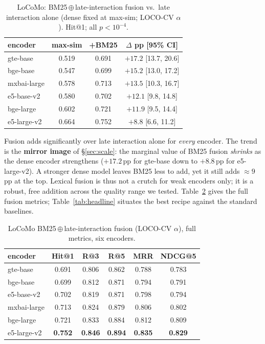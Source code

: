 \documentclass[10pt,twocolumn]{article}
\newcommand{\oxor}{\ensuremath{\oplus}}
\begin{document}
\begin{table}[t]
\centering\small
\caption{LoCoMo: BM25\,\oxor{}\,late-interaction fusion vs.\ late interaction
alone (dense fixed at max-sim; LOCO-CV $\alpha$). Hit@1; all $p<10^{-4}$.}
\label{tab:fuse}
\begin{tabular}{lccc}
\toprule
encoder & max-sim & +BM25 & $\Delta$ pp [95\% CI] \\
\midrule
gte-base    & 0.519 & 0.691 & $+17.2$ [13.7, 20.6] \\
bge-base    & 0.547 & 0.699 & $+15.2$ [13.0, 17.2] \\
mxbai-large & 0.578 & 0.713 & $+13.5$ [10.3, 16.7] \\
e5-base-v2  & 0.580 & 0.702 & $+12.1$ [9.8, 14.8] \\
bge-large   & 0.602 & 0.721 & $+11.9$ [9.5, 14.4] \\
e5-large-v2 & 0.664 & 0.752 & $+8.8$ [6.6, 11.2] \\
\bottomrule
\end{tabular}
\end{table}

Fusion adds significantly over late interaction alone for \emph{every}
encoder. The trend is the \textbf{mirror image} of \S\ref{sec:scale}: the
marginal value of BM25 fusion \emph{shrinks} as the dense encoder strengthens
($+17.2$\,pp for gte-base down to $+8.8$\,pp for e5-large-v2). A stronger dense
model leaves BM25 less to add, yet it still adds $\approx9$\,pp at the top.
Lexical fusion is thus not a crutch for weak encoders only; it is a robust,
free addition across the quality range we tested. Table~\ref{tab:fusionfull}
gives the full fusion metrics; Table~\ref{tab:headline} situates the best
recipe against the standard baselines.

\begin{table}[t]
\centering\small
\caption{LoCoMo BM25\,\oxor{}\,late-interaction fusion (LOCO-CV $\alpha$),
full metrics, six encoders.}
\label{tab:fusionfull}
\begin{tabular}{lccccc}
\toprule
encoder & Hit@1 & R@3 & R@5 & MRR & NDCG@5 \\
\midrule
gte-base    & 0.691 & 0.806 & 0.862 & 0.788 & 0.783 \\
bge-base    & 0.699 & 0.812 & 0.871 & 0.794 & 0.791 \\
e5-base-v2  & 0.702 & 0.819 & 0.871 & 0.798 & 0.794 \\
mxbai-large & 0.713 & 0.824 & 0.879 & 0.806 & 0.802 \\
bge-large   & 0.721 & 0.833 & 0.884 & 0.812 & 0.809 \\
e5-large-v2 & \textbf{0.752} & \textbf{0.846} & \textbf{0.894} & \textbf{0.835} & \textbf{0.829} \\
\bottomrule
\end{tabular}
\end{table}
\end{document}
